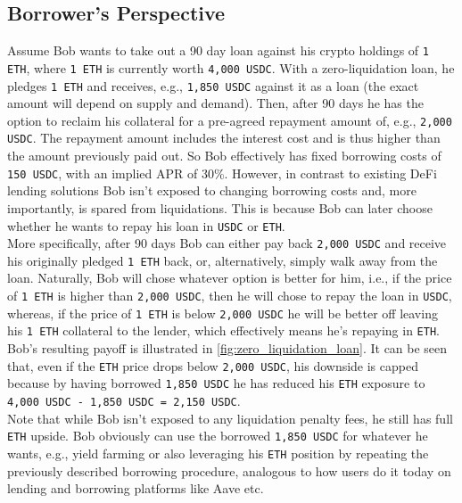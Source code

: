 \documentclass[a4paper]{article}
\begin{document}
\subsection{Borrower's Perspective}
\label{sec:borrower_perspective}
Assume Bob wants to take out a 90 day loan against his crypto holdings of \verb|1 ETH|, where \verb|1 ETH| is currently worth \verb|4,000 USDC|. With a zero-liquidation loan, he pledges \verb|1 ETH| and receives, e.g., \verb|1,850 USDC| against it as a loan (the exact amount will depend on supply and demand). Then, after 90 days he has the option to reclaim his collateral for a pre-agreed repayment amount of, e.g., \verb|2,000 USDC|. The repayment amount includes the interest cost and is thus higher than the amount previously paid out. So Bob effectively has fixed borrowing costs of \verb|150 USDC|, with an implied APR of 30\%. However, in contrast to existing DeFi lending solutions Bob isn't exposed to changing borrowing costs and, more importantly, is spared from liquidations. This is because Bob can later choose whether he wants to repay his loan in \verb|USDC| or \verb|ETH|.\\

More specifically, after 90 days Bob can either pay back \verb|2,000 USDC| and receive his originally pledged \verb|1 ETH| back, or, alternatively, simply walk away from the loan. Naturally, Bob will chose whatever option is better for him, i.e., if the price of \verb|1 ETH| is higher than \verb|2,000 USDC|, then he will chose to repay the loan in \verb|USDC|, whereas, if the price of \verb|1 ETH| is below \verb|2,000 USDC| he will be better off leaving his \verb|1 ETH| collateral to the lender, which effectively means he's repaying in \verb|ETH|. Bob's resulting payoff is illustrated in \cref{fig:zero_liquidation_loan}. It can be seen that, even if the \verb|ETH| price drops below \verb|2,000 USDC|, his downside is capped because by having borrowed \verb|1,850 USDC| he has reduced his \verb|ETH| exposure to \verb|4,000 USDC - 1,850 USDC = 2,150 USDC|.\\

Note that while Bob isn't exposed to any liquidation penalty fees, he still has full \verb|ETH| upside. Bob obviously can use the borrowed \verb|1,850 USDC| for whatever he wants, e.g., yield farming or also leveraging his \verb|ETH| position by repeating the previously described borrowing procedure, analogous to how users do it today on lending and borrowing platforms like Aave etc. 
\end{document}
